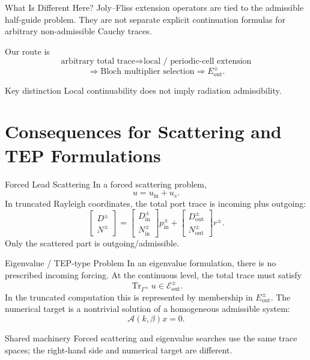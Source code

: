 \documentclass[aspectratio=169]{beamer}
\newcommand{\tr}{\operatorname{Tr}}
\begin{document}
\begin{frame}{What Is Different Here?}
  Joly--Fliss extension operators are tied to the admissible half-guide
  problem.  They are not separate explicit continuation formulas for arbitrary
  non-admissible Cauchy traces.

  \vspace{0.6em}
  Our route is
  \[
    \text{arbitrary total trace}
    \Longrightarrow
    \text{local / periodic-cell extension}
  \]
  \[
    \Longrightarrow
    \text{Bloch multiplier selection}
    \Longrightarrow
    E_{\mathrm{out}}^\pm.
  \]
  \begin{alertblock}{Key distinction}
    Local continuability does not imply radiation admissibility.
  \end{alertblock}
\end{frame}

\section{Consequences for Scattering and TEP Formulations}

\begin{frame}{Forced Lead Scattering}
  In a forced scattering problem,
  \[
    u=u_{\mathrm{in}}+u_s.
  \]
  In truncated Rayleigh coordinates, the total port trace is incoming plus
  outgoing:
  \[
    \begin{bmatrix}
      D^\pm\\
      N^\pm
    \end{bmatrix}
    =
    \begin{bmatrix}
      D_{\mathrm{in}}^\pm\\
      N_{\mathrm{in}}^\pm
    \end{bmatrix}p_{\mathrm{in}}^\pm
    +
    \begin{bmatrix}
      D_{\mathrm{out}}^\pm\\
      N_{\mathrm{out}}^\pm
    \end{bmatrix}r^\pm.
  \]
  Only the scattered part is outgoing/admissible.
\end{frame}

\begin{frame}{Eigenvalue / TEP-type Problem}
  In an eigenvalue formulation, there is no prescribed incoming forcing.
  At the continuous level, the total trace must satisfy
  \[
    \tr_{\Gamma^\pm}u
    \in
    \mathcal E_{\mathrm{out}}^\pm.
  \]
  In the truncated computation this is represented by membership in
  \(E_{\mathrm{out}}^\pm\).
  The numerical target is a nontrivial solution of a homogeneous admissible
  system:
  \[
    \mathcal A(k,\beta)x=0.
  \]
  \begin{block}{Shared machinery}
    Forced scattering and eigenvalue searches use the same trace spaces; the
    right-hand side and numerical target are different.
  \end{block}
\end{frame}
\end{document}
